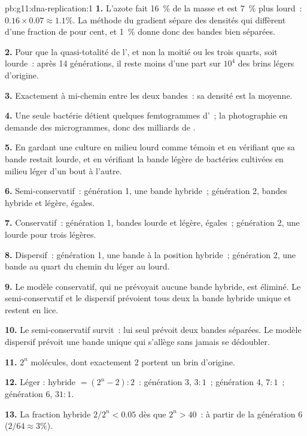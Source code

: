 \begin{solution}{pb:g11:dna-replication:1}
\textbf{1.} L'azote fait 16~\% de la masse et est 7~\% plus lourd~:
$0.16 \times 0.07 \approx 1.1\%$. La méthode du gradient sépare des
densités qui diffèrent d'une fraction de pour cent, et 1~\% donne donc
des bandes bien séparées.

\textbf{2.} Pour que la quasi-totalité de l', et non la moitié ou
les trois quarts, soit lourde~: après 14 générations, il reste moins
d'une part sur $10^4$ des brins légers d'origine.

\textbf{3.} Exactement à mi-chemin entre les deux bandes~: sa densité
est la moyenne.

\textbf{4.} Une seule bactérie détient quelques femtogrammes d'~; la
photographie en demande des microgrammes, donc des milliards de
.

\textbf{5.} En gardant une culture en milieu lourd comme témoin et en
vérifiant que sa bande restait lourde, et en vérifiant la bande légère
de bactéries cultivées en milieu léger d'un bout à l'autre.

\textbf{6.} Semi-conservatif~: génération 1, une bande hybride~;
génération 2, bandes hybride et légère, égales.

\textbf{7.} Conservatif~: génération 1, bandes lourde et légère,
égales~; génération 2, une lourde pour trois légères.

\textbf{8.} Dispersif~: génération 1, une bande à la position
hybride~; génération 2, une bande au quart du chemin du léger au lourd.

\textbf{9.} Le modèle conservatif, qui ne prévoyait aucune bande
hybride, est éliminé. Le semi-conservatif et le dispersif prévoient
tous deux la bande hybride unique et restent en lice.

\textbf{10.} Le semi-conservatif survit~: lui seul prévoit deux bandes
séparées. Le modèle dispersif prévoit une bande unique qui s'allège
sans jamais se dédoubler.

\textbf{11.} $2^n$ molécules, dont exactement 2 portent un brin
d'origine.

\textbf{12.} Léger : hybride $= (2^n - 2) : 2$~: génération 3, $3:1$~;
génération 4, $7:1$~; génération 6, $31:1$.

\textbf{13.} La fraction hybride $2/2^n < 0.05$ dès que $2^n > 40$~:
à partir de la génération 6 ($2/64 \approx 3\%$).


\end{solution}
